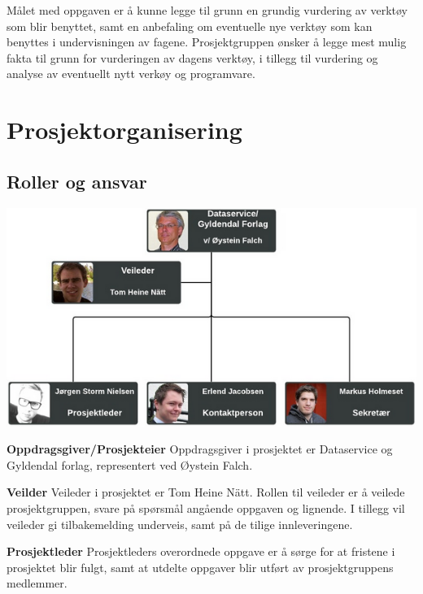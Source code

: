 \documentclass[norsk,a4paper,12pt]{article}
\begin{document}
Målet med oppgaven er å kunne legge til grunn en grundig vurdering av verktøy som blir benyttet, samt en anbefaling om eventuelle nye verktøy som kan benyttes i undervisningen av fagene. Prosjektgruppen ønsker å legge mest mulig fakta til grunn for vurderingen av dagens verktøy, i tillegg til vurdering og analyse av eventuellt nytt verkøy og programvare.

\section{Prosjektorganisering}

\subsection{Roller og ansvar}

\includegraphics{prorg.png}

\noindent\textbf{Oppdragsgiver/Prosjekteier}\newline
Oppdragsgiver i prosjektet er Dataservice og Gyldendal forlag, representert ved Øystein Falch.
\newline

\noindent\textbf{Veilder}\newline
Veileder i prosjektet er Tom Heine Nätt. Rollen til veileder er å veilede prosjektgruppen, svare på spørsmål angående oppgaven og lignende. I tillegg vil veileder gi tilbakemelding underveis, samt på de tilige innleveringene.
\newline

\noindent\textbf{Prosjektleder}\newline
Prosjektleders overordnede oppgave er å sørge for at fristene i prosjektet blir fulgt, samt at utdelte oppgaver blir utført av prosjektgruppens medlemmer. 
\newline
\end{document}
